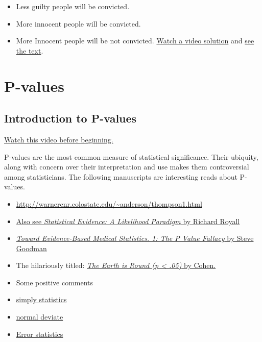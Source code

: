 \documentclass[]{article}
\begin{document}
\begin{itemize}
\itemsep1pt\parskip0pt
\item
  Less guilty people will be convicted.
\item
  More innocent people will be convicted.
\item
  More Innocent people will be not convicted.
  \href{https://www.youtube.com/watch?v=GlKPG24bZMI\&index=36\&list=PLpl-gQkQivXhHOcVeU3bSJg78zaDYbP9L}{Watch
  a video solution} and
  \href{http://bcaffo.github.io/courses/06_StatisticalInference/homework/hw4.html\#12}{see
  the text}.
\end{itemize}

\newpage

\section{P-values}\label{p-values}

\subsection{Introduction to P-values}\label{introduction-to-p-values}

\href{http://youtu.be/Ky68x_7iK6c?list=PLpl-gQkQivXiBmGyzLrUjzsblmQsLtkzJ}{Watch
this video before beginning.}

P-values are the most common measure of statistical significance. Their
ubiquity, along with concern over their interpretation and use makes
them controversial among statisticians. The following manuscripts are
interesting reads about P-values.

\begin{itemize}
\itemsep1pt\parskip0pt
\item
  \url{http://warnercnr.colostate.edu/~anderson/thompson1.html}
\item
  \href{http://www.crcpress.com/product/isbn/9780412044113}{Also see
  \emph{Statistical Evidence: A Likelihood Paradigm} by Richard Royall}
\item
  \href{https://scholar.google.com/scholar?q=towards+evidence+based+medical+statistics+the+p-value+fallacy\&hl=en\&as_sdt=0\&as_vis=1\&oi=scholart\&sa=X\&ei=uOTjVNHdG4anggSMlYOwBQ\&ved=0CBsQgQMwAA}{\emph{Toward
  Evidence-Based Medical Statistics. 1: The P Value Fallacy} by Steve
  Goodman}
\item
  The hilariously titled:
  \href{http://www.scopus.com/record/display.url?eid=2-s2.0-0039802908\&origin=inward\&txGid=BBE363C58BE8785BFF9E71AB60004733.ZmAySxCHIBxxTXbnsoe5w\%3a2}{\emph{The
  Earth is Round (p \textless{} .05)} by Cohen.}
\item
  Some positive comments
\item
  \href{http://simplystatistics.org/2012/01/06/p-values-and-hypothesis-testing-get-a-bad-rap-but-we/}{simply
  statistics}
\item
  \href{http://normaldeviate.wordpress.com/2013/03/14/double-misunderstandings-about-p-values/}{normal
  deviate}
\item
  \href{http://errorstatistics.com/2013/06/14/p-values-cant-be-trusted-except-when-used-to-argue-that-p-values-cant-be-trusted/}{Error
  statistics}
\end{itemize}
\end{document}
